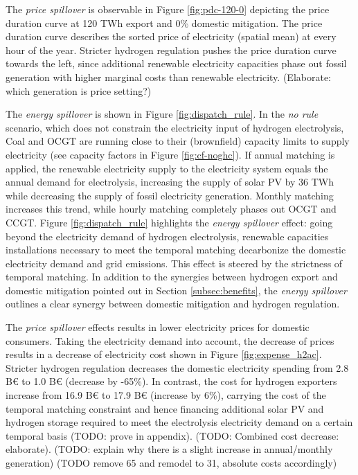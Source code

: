 The \textit{price spillover} is observable in Figure \ref{fig:pdc-120-0} depicting the price duration curve at 120 TWh export and 0\% domestic mitigation. The price duration curve describes the sorted price of electricity (spatial mean) at every hour of the year.
Stricter hydrogen regulation pushes the price duration curve towards the left, since additional renewable electricity capacities phase out fossil generation with higher marginal costs than renewable electricity. (Elaborate: which generation is price setting?)


The \textit{energy spillover} is shown in Figure \ref{fig:dispatch_rule}. In the \textit{no rule} scenario, which does not constrain the electricity input of hydrogen electrolysis, Coal and OCGT are running close to their (brownfield) capacity limits to supply electricity (see capacity factors in Figure \ref{fig:cf-noghc}). If annual matching is applied, the renewable electricity supply to the electricity system equals the annual demand for electrolysis, increasing the supply of solar PV by 36 TWh while decreasing the supply of fossil electricity generation. 
Monthly matching increases this trend, while hourly matching completely phases out OCGT and CCGT. Figure \ref{fig:dispatch_rule} highlights the \textit{energy spillover} effect: going beyond the electricity demand of hydrogen electrolysis, renewable capacities installations necessary to meet the temporal matching decarbonize the domestic electricity demand and grid emissions. This effect is steered by the strictness of temporal matching.
In addition to the synergies between hydrogen export and domestic mitigation pointed out in Section \ref{subsec:benefits}, the \textit{energy spillover} outlines a clear synergy between domestic mitigation and hydrogen regulation.



The \textit{price spillover} effects results in lower electricity prices for domestic consumers. Taking the electricity demand into account, the decrease of prices results in a decrease of electricity cost shown in 
Figure \ref{fig:expense_h2ac}. Stricter hydrogen regulation decreases the domestic electricity spending from 2.8 B€ to 1.0 B€ (decrease by -65\%). In contrast, the cost for hydrogen exporters increase from 16.9 B€ to 17.9 B€ (increase by 6\%), carrying the cost of the temporal matching constraint and hence financing additional solar PV and hydrogen storage required to meet the electrolysis electricity demand on a certain temporal basis (TODO: prove in appendix). (TODO: Combined cost decrease: elaborate). (TODO: explain why there is a slight increase in annual/monthly generation) (TODO remove 65 and remodel to 31, absolute costs accordingly)


